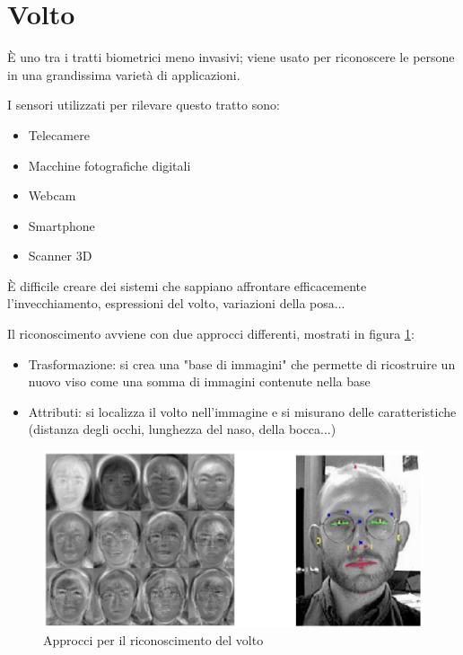 \documentclass{report}
\begin{document}
\section{Volto}

È uno tra i tratti biometrici meno invasivi; viene usato per riconoscere le persone in una grandissima varietà di applicazioni.

I sensori utilizzati per rilevare questo tratto sono:
\begin{itemize}
    \item Telecamere
    \item Macchine fotografiche digitali
    \item Webcam
    \item Smartphone
    \item Scanner 3D
\end{itemize}

È difficile creare dei sistemi che sappiano affrontare efficacemente l'invecchiamento, espressioni del volto, variazioni della posa...

Il riconoscimento avviene con due approcci differenti, mostrati in figura \ref{fig:volto}:
\begin{itemize}
    \item Trasformazione: si crea una "base di immagini" che permette di ricostruire un nuovo viso come una somma di immagini contenute nella base
    \item Attributi: si localizza il volto nell'immagine e si misurano delle caratteristiche (distanza degli occhi, lunghezza del naso, della bocca...)
\end{itemize}

\begin{figure}
    \centering
    \includegraphics[width=1\linewidth]{images/volto.png}
    \caption{Approcci per il riconoscimento del volto}
    \label{fig:volto}
\end{figure}
\end{document}
